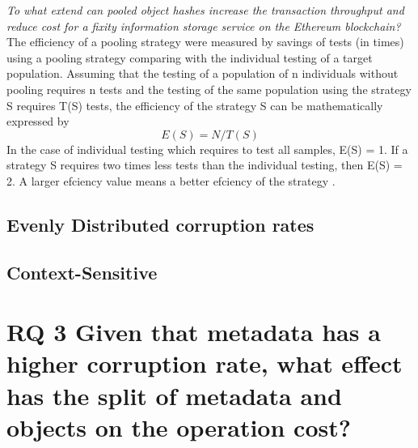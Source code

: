 \textit{To what extend can pooled object hashes increase the transaction throughput and reduce cost for a fixity information storage service on the Ethereum blockchain?}
\label{sec:rq2}
The efficiency of a pooling strategy were measured by savings of tests (in times) using a pooling strategy comparing with the individual testing of a target population. Assuming that the testing of a population of n individuals without pooling requires n tests and the testing of the same population using the strategy S requires T(S) tests, the efficiency of the strategy S can be mathematically expressed by 
\begin{equation}\label{eq:expected_throughput}
    E(S) = N/T(S)
\end{equation}
In the case of individual testing which requires to test all samples, E(S) = 1. If a strategy S requires two times less tests than the individual testing, then E(S) = 2. A larger efciency value means a better efciency of the strategy \cite[4]{vzilinskas2021pooled}.
\subsection{Evenly Distributed corruption rates}
\subsection{Context-Sensitive}
\cite[4]{deckert2020simulation}
\section{RQ 3 Given that metadata has a higher corruption rate, what effect has the split of metadata and objects on the operation cost?}
